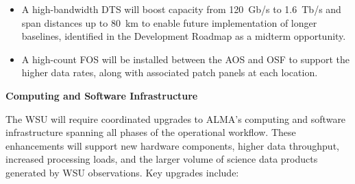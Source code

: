 \begin{itemize}[itemsep=-0.5em]
%
\item A high-bandwidth \ac{DTS} will boost capacity from 120~Gb/s to 1.6~Tb/s and span distances up to 80~km to enable future implementation of longer baselines, identified in the Development Roadmap as a midterm opportunity.
%
\item A high-count \ac{FOS} will be installed between the AOS and OSF to support the higher data rates, along with associated patch panels at each location.
\end{itemize}



\noindent\textbf{Computing and Software Infrastructure}


The WSU will require coordinated upgrades to ALMA’s computing and software infrastructure spanning all phases of the operational workflow. These enhancements will support new hardware components, higher data throughput, increased processing loads, and the larger volume of science data products generated by WSU observations. Key upgrades include:


